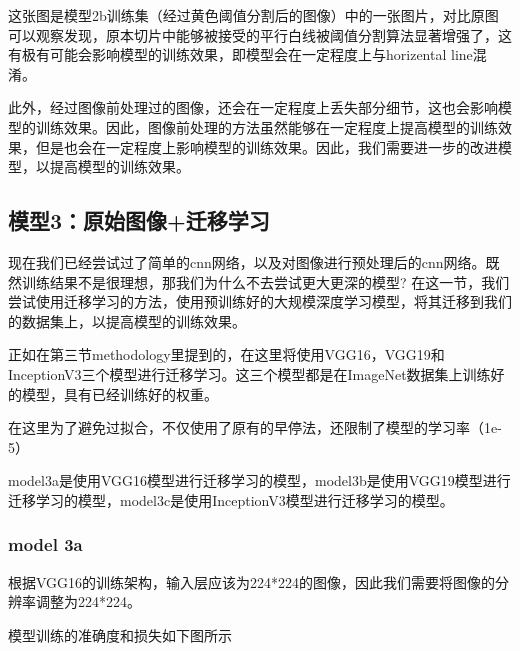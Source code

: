 这张图是模型2b训练集（经过黄色阈值分割后的图像）中的一张图片，对比原图可以观察发现，原本切片中能够被接受的平行白线被阈值分割算法显著增强了，这有极有可能会影响模型的训练效果，即模型会在一定程度上与horizental line混淆。

此外，经过图像前处理过的图像，还会在一定程度上丢失部分细节，这也会影响模型的训练效果。因此，图像前处理的方法虽然能够在一定程度上提高模型的训练效果，但是也会在一定程度上影响模型的训练效果。因此，我们需要进一步的改进模型，以提高模型的训练效果。

\FloatBarrier
\subsection{模型3：原始图像+迁移学习}

现在我们已经尝试过了简单的cnn网络，以及对图像进行预处理后的cnn网络。既然训练结果不是很理想，那我们为什么不去尝试更大更深的模型? 在这一节，我们尝试使用迁移学习的方法，使用预训练好的大规模深度学习模型，将其迁移到我们的数据集上，以提高模型的训练效果。

正如在第三节methodology里提到的，在这里将使用VGG16，VGG19和InceptionV3三个模型进行迁移学习。这三个模型都是在ImageNet数据集上训练好的模型，具有已经训练好的权重。

在这里为了避免过拟合，不仅使用了原有的早停法，还限制了模型的学习率（1e-5）

model3a是使用VGG16模型进行迁移学习的模型，model3b是使用VGG19模型进行迁移学习的模型，model3c是使用InceptionV3模型进行迁移学习的模型。

\subsubsection{model 3a}
根据VGG16的训练架构，输入层应该为224*224的图像，因此我们需要将图像的分辨率调整为224*224。

模型训练的准确度和损失如下图所示

